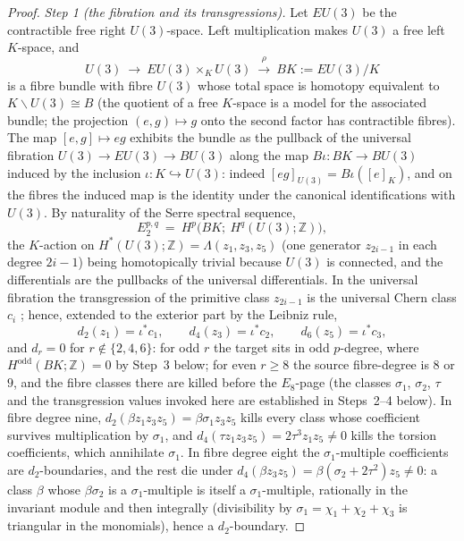 \documentclass[11pt,a4paper]{article}
\begin{document}
\begin{proof}
\emph{Step 1 (the fibration and its transgressions).} Let $EU(3)$ be the
contractible free right $U(3)$-space. Left multiplication makes $U(3)$ a
free left $K$-space, and
\[
U(3)\ \longrightarrow\ EU(3)\times_K U(3)\ \overset{\rho}{\longrightarrow}\
BK:=EU(3)/K
\]
is a fibre bundle with fibre $U(3)$ whose total space is homotopy equivalent
to $K\backslash U(3)\cong B$ (the quotient of a free $K$-space is a model
for the associated bundle; the projection $(e,g)\mapsto g$ onto the second
factor has contractible fibres). The map $[e,g]\mapsto eg$ exhibits the
bundle as the pullback of the universal fibration $U(3)\to EU(3)\to BU(3)$
along the map $B\iota\colon BK\to BU(3)$ induced by the inclusion
$\iota\colon K\hookrightarrow U(3)$: indeed $[eg]_{U(3)}=B\iota([e]_K)$, and
on the fibres the induced map is the identity under the canonical
identifications with $U(3)$. By naturality of the Serre spectral sequence,
\[
E_2^{p,q}\ =\ H^p\bigl(BK;\ H^q(U(3);\mathbb Z)\bigr),
\]
the $K$-action on $H^*(U(3);\mathbb Z)=\Lambda(z_1,z_3,z_5)$ (one generator
$z_{2i-1}$ in each degree $2i-1$) being homotopically trivial because $U(3)$
is connected, and the differentials are the pullbacks of the universal
differentials. In the universal fibration the transgression of the primitive
class $z_{2i-1}$ is the universal Chern class $c_i$
\cite{MilnorStasheff1974,HatcherSS}; hence, extended to the exterior part by
the Leibniz rule,
\[
d_2(z_1)=\iota^*c_1,\qquad d_4(z_3)=\iota^*c_2,\qquad d_6(z_5)=\iota^*c_3,
\]
and $d_r=0$ for $r\notin\{2,4,6\}$: for odd $r$ the target sits in odd
$p$-degree, where $H^{\mathrm{odd}}(BK;\mathbb Z)=0$ by Step~3 below; for
even $r\ge8$ the source fibre-degree is $8$ or $9$, and the fibre classes
there are killed before the $E_8$-page (the classes $\sigma_1$, $\sigma_2$,
$\tau$ and the transgression values invoked here are established in
Steps~2--4 below). In fibre degree nine,
$d_2(\beta z_1z_3z_5)=\beta\sigma_1z_3z_5$ kills every class whose
coefficient survives multiplication by $\sigma_1$, and
$d_4(\tau z_1z_3z_5)=2\tau^3z_1z_5\ne0$ kills the torsion coefficients,
which annihilate $\sigma_1$. In fibre degree eight the $\sigma_1$-multiple
coefficients are $d_2$-boundaries, and the rest die under
$d_4(\beta z_3z_5)=\beta(\sigma_2+2\tau^2)z_5\ne0$: a class $\beta$ whose
$\beta\sigma_2$ is a $\sigma_1$-multiple is itself a $\sigma_1$-multiple,
rationally in the invariant module and then integrally (divisibility by
$\sigma_1=\chi_1+\chi_2+\chi_3$ is triangular in the monomials), hence a
$d_2$-boundary.


\end{proof}
\end{document}
